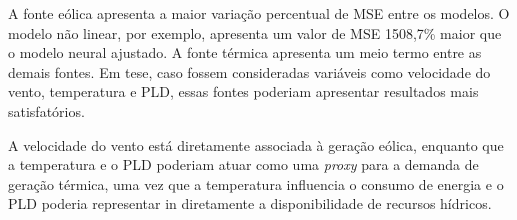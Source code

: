 A fonte eólica apresenta a maior variação percentual de MSE entre os modelos. O modelo não linear, por exemplo, apresenta
um valor de MSE 1508,7\% maior que o modelo neural ajustado. A fonte térmica apresenta um meio termo entre as demais fontes.
Em tese, caso fossem consideradas variáveis como velocidade do vento, temperatura e PLD, essas fontes poderiam apresentar resultados
mais satisfatórios. 

A velocidade do vento está diretamente associada à geração eólica, enquanto que a temperatura e o PLD poderiam atuar como
uma \textit{proxy} para a demanda de geração térmica, uma vez que a temperatura influencia o consumo de energia e o PLD poderia
representar in diretamente a disponibilidade de recursos hídricos.

\begin{table}[htb]
  \centering
\end{table}